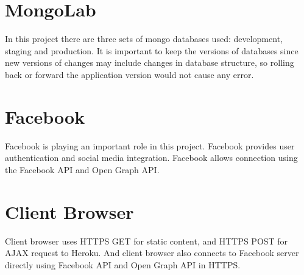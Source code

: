 \section{MongoLab}
In this project there are three sets of mongo databases used: development, staging and production. It is important to keep the versions of databases since new versions of changes may include changes in database structure, so rolling back or forward the application version would not cause any error. 

\section{Facebook}
Facebook is playing an important role in this project. Facebook provides user authentication and social media integration. Facebook allows connection using the Facebook API and Open Graph API.

\section{Client Browser}
Client browser uses HTTPS GET for static content, and HTTPS POST for AJAX request to Heroku. And client browser also connects to Facebook server directly using Facebook API and Open Graph API in HTTPS.
 
